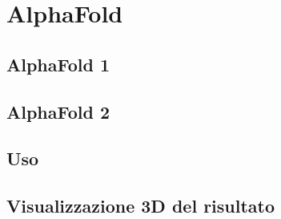 \chapter{AlphaFold}
\section{AlphaFold 1}
\section{AlphaFold 2}
\section{Uso}
\section{Visualizzazione 3D del risultato}

\clearpage